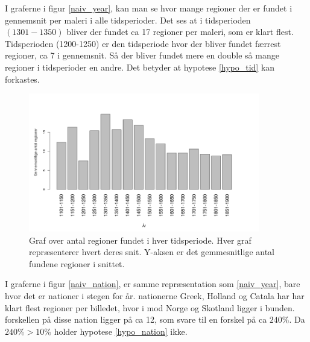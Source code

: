 I graferne i figur \ref{naiv_year}, kan man se hvor mange regioner der
er fundet i gennemsnit per maleri i alle tidsperioder. Det ses at i
tidsperioden $(1301-1350)$ bliver der fundet ca 17 regioner per maleri,
som er klart flest. Tidsperioden (1200-1250) er den tidsperiode hvor der
bliver fundet færrest regioner, ca 7 i gennemsnit. Så der bliver fundet
mere en double så mange regioner i tidsperioder en andre. Det betyder at
hypotese \ref{hypo_tid} kan forkastes.

\begin{figure}[!h]
	\begin{center}
		\includegraphics[angle=0,width=0.90\textwidth]{afsnit/resultater/billeder/yearcut.png}
	\end{center}
	\caption{Graf over antal regioner fundet i hver
       tidsperiode. Hver graf repræsenterer hvert deres snit. Y-aksen er
       det gemmesnitlige antal fundene regioner i snittet.}
	\label{udvidet_year}
\end{figure}

I graferne i figur \ref{naiv_nation}, er samme repræsentation som
\ref{naiv_year}, bare hvor det er nationer i stegen for år. nationerne
Greek, Holland og Catala har har klart flest regioner per billedet, hvor
i mod Norge og Skotland ligger i bunden. forskellen på disse nation
ligger på ca 12, som svare til en forskel på ca $240\%$.
Da $240 \% > 10 \%$ holder hypotese \ref{hypo_nation} ikke.

